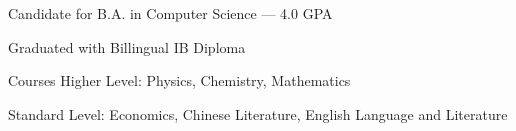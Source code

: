 \documentclass{resume}
\begin{document}
\begin{education}
    \begin{description}
        \item Candidate for B.A. in Computer Science --- 4.0 GPA

    \end{description}
    \begin{description}
        \item Graduated with Billingual IB Diploma
        \item Courses
            \subitem Higher Level: Physics, Chemistry, Mathematics

            \subitem Standard Level: Economics, Chinese Literature, English Language and Literature
    \end{description}
\end{education}
\end{document}
